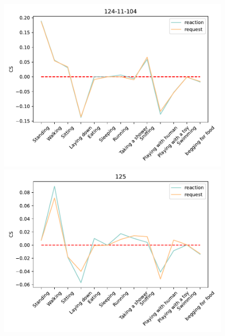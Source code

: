 \begin{figure}[ht]
\begin{minipage}[b]{.3\linewidth}
		\end{minipage}
		
				\begin{minipage}[b]{.3\linewidth}
			\centering
			\includegraphics[width=0.99\linewidth]{./35word/124-11-104.pdf}
		\end{minipage}
		\begin{minipage}[b]{.3\linewidth}
			\centering
			\includegraphics[width=0.99\linewidth]{./35word/125.pdf}
		\end{minipage}
		\begin{minipage}[b]{.3\linewidth}
			\centering

\end{minipage}
\end{figure}
